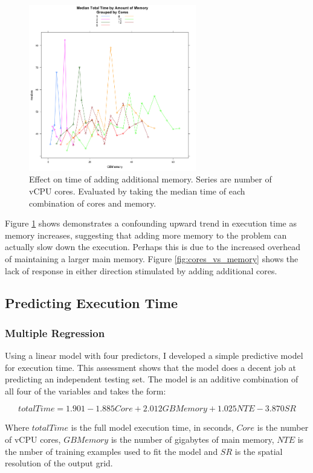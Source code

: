 \documentclass[a4paper]{article}
\begin{document}
\begin{figure}
\centering
\includegraphics[width=0.65\textwidth]{Cores_by_memory.png}
\caption{Effect on time of adding additional memory.  Series are number of vCPU cores. Evaluated by taking the median time of each combination of cores and memory.}\label{fig:memory_vs_cores}
\end{figure}

Figure \ref{fig:memory_vs_cores} shows demonstrates a confounding upward trend in execution time as memory increases, suggesting that adding more memory to the problem can actually slow down the execution.  Perhaps this is due to the increased overhead of maintaining a larger main memory.  Figure \ref{fig:cores_vs_memory} shows the lack of response in either direction stimulated by adding additional cores.

\subsection{Predicting Execution Time}
\subsubsection{Multiple Regression}
Using a linear model with four predictors, I developed a simple predictive model for execution time.  This assessment shows that the model does a decent job at predicting an independent testing set.  The model is an additive combination of all four of the variables and takes the form:


\[totalTime = 1.901 - 1.885Core +  2.012GBMemory + 1.025NTE - 3.870SR \]

Where $totalTime$ is the full model execution time, in seconds, $Core$ is the number of vCPU cores, $GBMemory$ is the number of gigabytes of main memory, $NTE$ is the nmber of training examples used to fit the model and $SR$ is the spatial resolution of the output grid.
\end{document}
